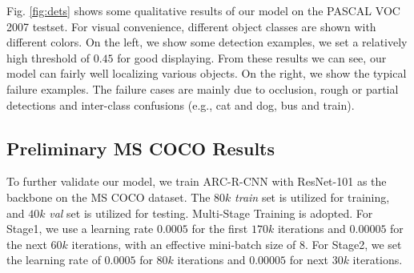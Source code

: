 \documentclass[10pt,twocolumn,letterpaper]{article}
\begin{document}
\begin{table} 
\begin{center}
\end{center}
\caption{mAP results with IoU $\ge 0.5$ of Faster-RCNN, R-FCN and ARC-R-CNN on PASCAL VOC 2012 test set. Time is evaluated on a Nvidia K40 GPU. $\dag:$ \small{http://host.robots.ox.ac.uk:8080/anonymous/C3H0GM.html} $\ddag:$ \small{http://host.robots.ox.ac.uk:8080/anonymous/WB5KF0.html}}
\label{tab:12coarse} 
\vspace{-3mm}
\end{table}

Fig. \ref{fig:dets} shows some qualitative results of our model on the PASCAL VOC 2007 testset. For visual convenience, different object classes are shown with different colors. 
On the left, we show some detection examples, we set a relatively high threshold of $0.45$ for good displaying. From these results we can see, our model can fairly well localizing various objects. 
On the right, we show the typical failure examples. The failure cases are mainly due to occlusion, rough or partial detections and inter-class confusions (e.g., cat and dog, bus and train).

\vspace{-1mm}
\subsection{Preliminary MS COCO Results}
\vspace{-1mm}
To further validate our model, we train ARC-R-CNN with ResNet-101 as the backbone on the MS COCO dataset. The $80k$ \textit{train} set is utilized for training, and $40k$ \textit{val} set is utilized for testing. Multi-Stage Training is adopted. For Stage1, we use a learning rate $0.0005$ for the first $170k$ iterations and $0.00005$ for the next $60k$ iterations, with an effective mini-batch size of $8$. For Stage2, we set the learning rate of $0.0005$ for $80k$ iterations and $0.00005$ for next $30k$ iterations.
\end{document}
